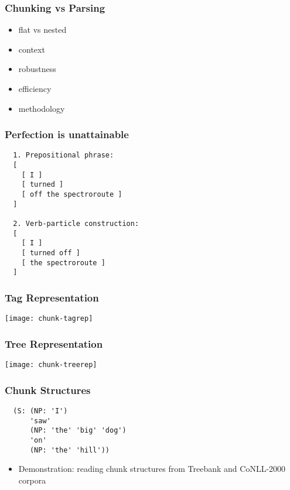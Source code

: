 \begin{frame}[fragile]\frametitle{Chunking vs Parsing}
  \begin{itemize}
  \item flat vs nested
  \item context
  \item robustness
  \item efficiency
  \item methodology
  \end{itemize}
\end{frame}

\begin{frame}[fragile]\frametitle{Perfection is unattainable}
\begin{lstlisting}
  1. Prepositional phrase:
  [
    [ I ]
    [ turned ]
    [ off the spectroroute ]
  ]

  2. Verb-particle construction:
  [
    [ I ]
    [ turned off ]
    [ the spectroroute ]
  ]
\end{lstlisting}
\end{frame}

\begin{frame}[fragile]
  \frametitle{Tag Representation}
\begin{center}
\texttt{[image: chunk-tagrep]}
\end{center}
\end{frame}


\begin{frame}[fragile]
  \frametitle{Tree Representation}
\begin{center}
\texttt{[image: chunk-treerep]}
\end{center}
\end{frame}

\begin{frame}[fragile]\frametitle{Chunk Structures}
\begin{lstlisting}
  (S: (NP: 'I')
      'saw'
      (NP: 'the' 'big' 'dog')
      'on'
      (NP: 'the' 'hill'))
\end{lstlisting}
  \begin{itemize}
  \item Demonstration: reading chunk structures from Treebank and CoNLL-2000 corpora
  \end{itemize}
\end{frame}

